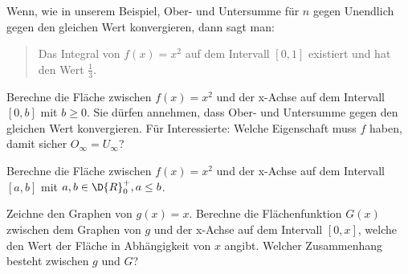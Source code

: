 \documentclass[%
11pt,%
twoside,%
titlepage,%
german,%
headsepline%
]{scrartcl}
\begin{document}
Wenn, wie in unserem Beispiel, Ober- und Untersumme für $n$ gegen Unendlich gegen den gleichen Wert konvergieren, dann sagt man:
\begin{quote}
\glqq Das Integral von $f(x)=x^2$ auf dem Intervall $[0,1]$ existiert und hat den Wert $\frac{1}{3}$\grqq.
\end{quote}


\begin{ueb}[Zwischensummen]
Berechne die Fläche zwischen $f(x)=x^2$ und der x-Achse auf dem Intervall $[0,b]$ mit $b\geq0$. Sie dürfen annehmen, dass Ober- und Untersumme gegen den gleichen Wert konvergieren. Für Interessierte: Welche Eigenschaft muss $f$ haben, damit sicher $O_\infty=U_\infty$?
\end{ueb}

\begin{ueb}[Zwischensummen 2]
Berechne die Fläche zwischen $f(x)=x^2$ und der x-Achse auf dem Intervall $[a,b]$ mit $a,b\in\D{R}^+_0, a\leq b$.
\end{ueb}

\begin{ueb}[Stammfunktion]
Zeichne den Graphen von $g(x)=x$. Berechne die Flächenfunktion $G(x)$ zwischen dem Graphen von $g$ und der x-Achse auf dem Intervall $[0,x]$, welche den Wert der Fläche in Abhängigkeit von $x$ angibt. Welcher Zusammenhang besteht zwischen $g$ und $G$?
\end{ueb}
\end{document}
